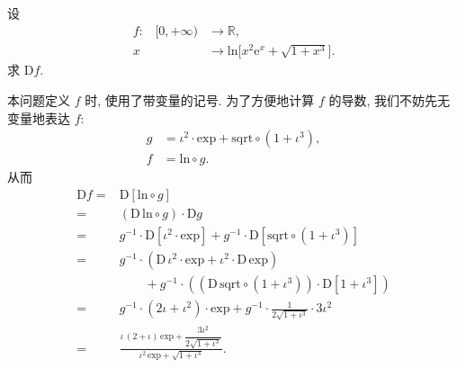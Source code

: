 \begin{example}
    设
    \begin{align*}
        \text{$f$:} \quad
        [0, +\infty) & \to \mathbb{R},                                                    \\
        x            & \to \mathrm{ln} \Bigg[ x^2 \mathrm{e}^{x} + \sqrt{1 + x^3} \Bigg].
    \end{align*}
    求 $\mathrm{D}f$.

    本问题定义 $f$ 时, 使用了带变量的记号. 为了方便地计算 $f$ 的导数, 我们不妨先无变量地表达 $f$:
    \begin{align*}
        g & = \iota^2 \cdot \mathrm{exp} + \mathrm{sqrt} \circ (1 + \iota^3), \\
        f & = \mathrm{ln} \circ g.
    \end{align*}
    从而
    \begin{align*}
        \mathrm{D}f
        = {} & \mathrm{D}[\mathrm{ln} \circ g]                                        \\
        = {} & (\mathrm{D}\,\mathrm{ln} \circ g) \cdot \mathrm{D}g                    \\
        = {} & g^{-1} \cdot \mathrm{D}[\iota^2 \cdot \mathrm{exp}]
        + g^{-1} \cdot \mathrm{D}[\mathrm{sqrt} \circ (1 + \iota^3)]                  \\
        = {} & g^{-1} \cdot (\mathrm{D}\,\iota^2 \cdot \mathrm{exp}
        + \iota^2 \cdot \mathrm{D}\,\mathrm{exp})                                     \\
             & \qquad + g^{-1} \cdot ((\mathrm{D}\,\mathrm{sqrt} \circ (1 + \iota^3))
        \cdot \mathrm{D}[1 + \iota^3])                                                \\
        = {} & g^{-1} \cdot (2\iota + \iota^2) \cdot \mathrm{exp}
        + g^{-1} \cdot \frac{1}{2\sqrt{1 + \iota^3}} \cdot 3\iota^2                   \\
        = {} & \frac{\iota\,(2 + \iota)\,\mathrm{exp}
            + \dfrac{3\iota^2}{2\sqrt{1 + \iota^3}}}
        {\iota^2 \,\mathrm{exp} + \sqrt{1 + \iota^3}}.
    \end{align*}
\end{example}
